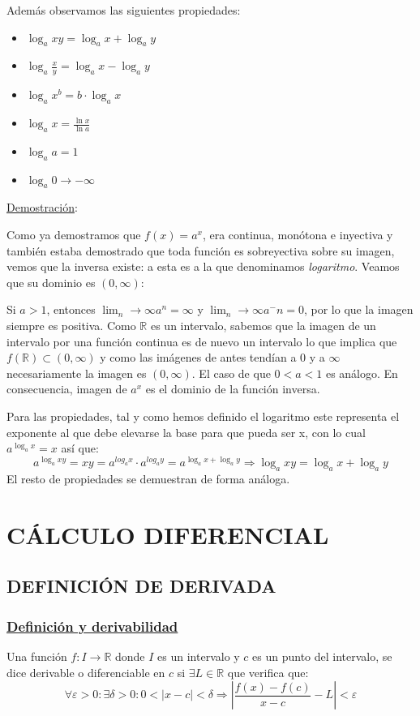 \documentclass[10pt,a4paper,openright]{book}
\begin{document}
Además observamos las siguientes propiedades:
\begin{itemize}
\item $\log_a xy = \log_a x + \log_a y$
\item $\log_a \frac{x}{y} = \log_a x - \log_a y$
\item $\log_a x^b = b\cdot \log_a x$
\item $\log_a x = \frac{\ln x}{\ln a}$
\item $\log_a a = 1$
\item $\log_a 0 \rightarrow -\infty$
\end{itemize}

\underline{Demostración}:\par
Como ya demostramos que $f(x)=a^x$, era continua, monótona e inyectiva y también estaba demostrado que toda función es sobreyectiva sobre su imagen, vemos que la inversa existe: a esta es a la que denominamos \textit{logaritmo}. Veamos que su dominio es $(0,\infty)$:\par
Si $a>1$, entonces $\lim_n\rightarrow \infty a^n = \infty$ y $\lim_n\rightarrow \infty a^-n = 0$, por lo que la imagen siempre es positiva. Como $\mathbb R$ es un intervalo, sabemos que la imagen de un intervalo por una función continua es de nuevo un intervalo lo que implica que $f(\mathbb R)\subset (0,\infty)$ y como las imágenes de antes tendían a 0 y a $\infty$ necesariamente la imagen es $(0,\infty)$. El caso de que $0<a<1$ es análogo. En consecuencia, imagen de $a^x$ es el dominio de la función inversa.

Para las propiedades, tal y como hemos definido el logaritmo este representa el exponente al que debe elevarse la base para que pueda ser x, con lo cual $a^{\log_a x} = x$ así que:
$$a^{\log_a xy}= xy=a^{log_a x}\cdot a^{log_a y}=a^{\log_a x + \log_a y}\Rightarrow \log_a xy = \log_a x +\log_a y$$
El resto de propiedades se demuestran de forma análoga.


\chapter*{CÁLCULO DIFERENCIAL}
\section*{DEFINICIÓN DE DERIVADA}
\subsection*{\underline{Definición y derivabilidad}}
Una función $f: I\rightarrow \mathbb R$ donde $I$ es un intervalo y $c$ es un punto del intervalo, se dice derivable o diferenciable en $c$ si $\exists L\in \mathbb R$ que verifica que:
$$\forall \varepsilon>0: \exists \delta>0 : 0<|x-c|<\delta\Rightarrow \left|\frac{f(x)-f(c)}{x-c}-L\right|<\varepsilon$$
\end{document}
